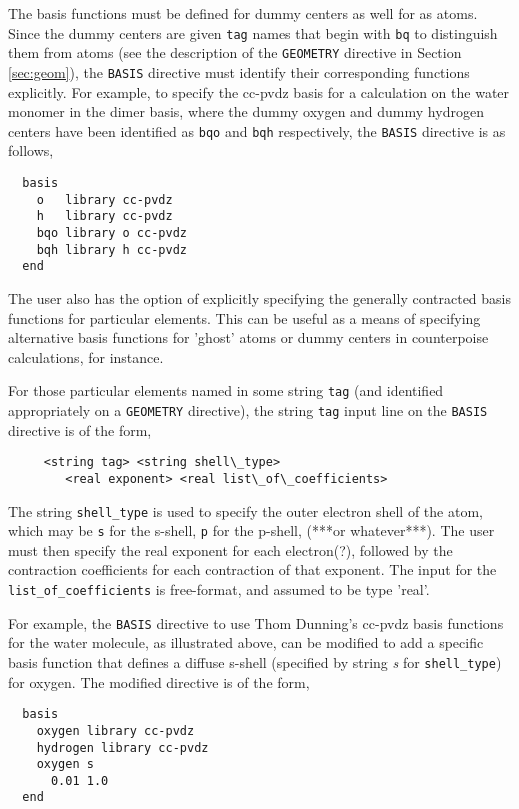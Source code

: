 The basis functions must be defined for dummy centers as well for
as atoms.  Since the dummy centers are given \verb+tag+ names that begin
with \verb+bq+ to distinguish them from atoms (see the description of the
\verb+GEOMETRY+ directive in Section \ref{sec:geom}), the \verb+BASIS+
directive must identify their corresponding functions explicitly.  For
example, to specify the cc-pvdz basis for a calculation on the water 
monomer in the dimer basis, where the dummy oxygen and dummy hydrogen
centers have been identified as \verb+bqo+ and \verb+bqh+ respectively,
the \verb+BASIS+ directive is as follows,

\begin{verbatim}
  basis
    o   library cc-pvdz
    h   library cc-pvdz
    bqo library o cc-pvdz
    bqh library h cc-pvdz
  end
\end{verbatim}


The user also has the option of explicitly specifying the generally
contracted basis functions for particular elements.  This can be useful
as a means of specifying alternative basis functions for 'ghost' atoms
or dummy centers in counterpoise calculations, for instance.

For those particular elements named in some string \verb+tag+ (and identified
appropriately on a \verb+GEOMETRY+ directive), the string \verb+tag+ input 
line on the \verb+BASIS+ directive is of the form,

\begin{verbatim}
     <string tag> <string shell\_type>
        <real exponent> <real list\_of\_coefficients>
\end{verbatim}

The string \verb+shell_type+ is used to specify the outer electron shell of
the atom, which may be \verb+s+ for the s-shell, \verb+p+ for the p-shell,
(***or whatever***).  The user must then specify the real exponent for
each electron(?), followed by the contraction coefficients for each 
contraction of that exponent.  The input for the \verb+list_of_coefficients+
is free-format, and assumed to be type 'real'.

For example, the \verb+BASIS+ directive to use Thom Dunning's cc-pvdz basis 
functions for the water molecule, as illustrated above, 
can be modified to add a specific basis function that defines a diffuse 
s-shell (specified by string {\em s} for \verb+shell_type+) for oxygen.
The modified directive is of the form,

\begin{verbatim}
  basis
    oxygen library cc-pvdz
    hydrogen library cc-pvdz
    oxygen s
      0.01 1.0
  end
\end{verbatim}

